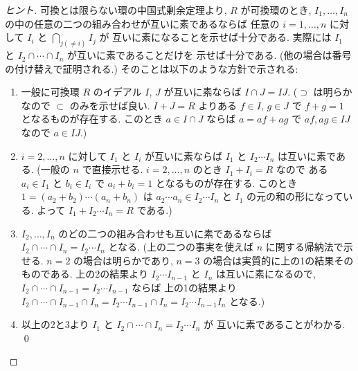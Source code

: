 \documentclass[12pt,twoside]{jarticle}
\begin{document}
\begin{proof}[ヒント]
 可換とは限らない環の中国式剰余定理より, 
 $R$ が可換環のとき, %
 $I_1,\ldots,I_n$ の中の任意の二つの組み合わせが互いに素であるならば %
 任意の $i=1,\ldots,n$ に対して $I_i$ と $\bigcap_{j(\ne i)}I_j$ が
 互いに素になることを示せば十分である. 
 実際には $I_1$ と $I_2\cap\cdots\cap I_n$ が互いに素であることだけを
 示せば十分である. (他の場合は番号の付け替えで証明される.)
 そのことは以下のような方針で示される:
 \begin{enumerate}
  \item 一般に可換環 $R$ のイデアル $I$, $J$ が互いに素ならば $I\cap J=IJ$.
   ($\supset$ は明らかなので $\subset$ のみを示せば良い. 
    $I+J=R$ よりある $f\in I$, $g\in J$ で $f+g=1$ となるものが存在する.
    このとき $a\in I\cap J$ ならば $a=af+ag$ で $af,ag\in IJ$ なので $a\in IJ$.)
  \item $i=2,\ldots,n$ に対して $I_1$ と $I_i$ が互いに素ならば %
   $I_1$ と $I_2\cdots I_n$ は互いに素である. 
   (一般の $n$ で直接示せる. $i=2,\dots,n$ のとき $I_1+I_i=R$ なので
   ある $a_i\in I_1$ と $b_i\in I_i$ で $a_i+b_i=1$ となるものが存在する. 
   このとき $1=(a_2+b_2)\cdots(a_n+b_n)$ は $a_2\cdots a_n\in I_2\cdots I_n$ 
   と $I_1$ の元の和の形になっている. よって $I_1+I_2\cdots I_n=R$ である.)
  \item $I_2,\ldots,I_n$ のどの二つの組み合わせも互いに素であるならば %
   $I_2\cap\cdots\cap I_n=I_2\cdots I_n$ となる. 
   (上の二つの事実を使えば $n$ に関する帰納法で示せる.
   $n=2$ の場合は明らかであり, $n=3$ の場合は実質的に上の1の結果そのものである.
   上の2の結果より $I_2\cdots I_{n-1}$ と $I_n$ は互いに素になるので, 
   $I_2\cap\cdots\cap I_{n-1}=I_2\cdots I_{n-1}$ ならば
   上の1の結果より $I_2\cap\cdots\cap I_{n-1}\cap I_n 
   = I_2\cdots I_{n-1}\cap I_n = I_2\cdots I_{n-1}I_n$ となる.)
  \item 以上の2と3より $I_1$ と $I_2\cap\cdots\cap I_n=I_2\cdots I_n$ が
   互いに素であることがわかる. 
  \qed
 \end{enumerate} 
\end{proof}
\end{document}
